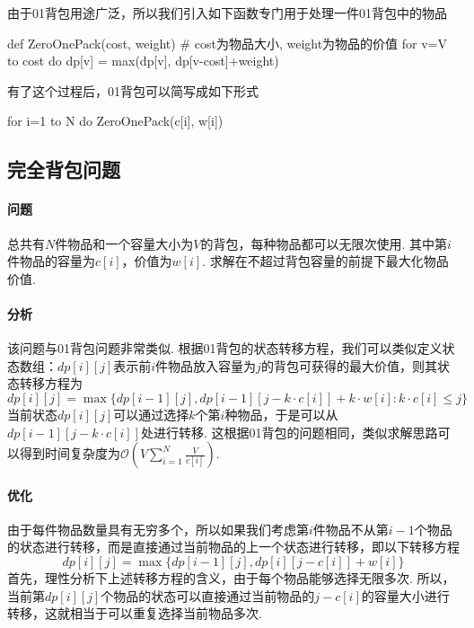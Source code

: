 \documentclass[12pt, a4paper, oneside]{ctexart}
\numberwithin{equation}{section}  %
\let\leq=\leqslant %
\def\O{\mathcal{O}}         %
\begin{document}
由于01背包用途广泛，所以我们引入如下函数专门用于处理一件01背包中的物品
\begin{pythoncode}
def ZeroOnePack(cost, weight)  # cost为物品大小, weight为物品的价值
    for v=V to cost do
        dp[v] = max(dp[v], dp[v-cost]+weight)
\end{pythoncode}
有了这个过程后，01背包可以简写成如下形式
\begin{pythoncode}
for i=1 to N do
    ZeroOnePack(c[i], w[i])
\end{pythoncode}
\subsection{完全背包问题}
\paragraph*{问题}总共有$N$件物品和一个容量大小为$V$的背包，每种物品都可以无限次使用. 其中第$i$件物品的容量为$c[i]$，价值为$w[i]$. 求解在不超过背包容量的前提下最大化物品价值.
\paragraph*{分析}该问题与01背包问题非常类似. 根据01背包的状态转移方程，我们可以类似定义状态数组：$dp[i][j]$表示前$i$件物品放入容量为$j$的背包可获得的最大价值，则其状态转移方程为
\begin{equation}\label{eq-1}
    dp[i][j] = \max\{dp[i-1][j], dp[i-1][j-k\cdot c[i]]+k\cdot w[i]: k\cdot c[i]\leq j\}
\end{equation}
当前状态$dp[i][j]$可以通过选择$k$个第$i$种物品，于是可以从$dp[i-1][j-k\cdot c[i]]$处进行转移. 这根据01背包的问题相同，类似求解思路可以得到时间复杂度为$\O(V\sum_{i=1}^N\frac{V}{c[i]})$.
\paragraph*{优化}由于每件物品数量具有无穷多个，所以如果我们考虑第$i$件物品不从第$i-1$个物品的状态进行转移，而是直接通过当前物品的上一个状态进行转移，即以下转移方程
\begin{equation}\label{eq-2}
    dp[i][j] = \max\{dp[i-1][j], dp[i][j-c[i]]+w[i]\}
\end{equation}
首先，理性分析下上述转移方程的含义，由于每个物品能够选择无限多次. 所以，当前第$dp[i][j]$个物品的状态可以直接通过当前物品的$j-c[i]$的容量大小进行转移，这就相当于可以重复选择当前物品多次.
\end{document}

